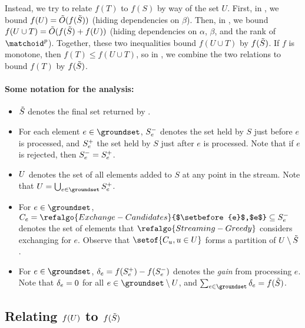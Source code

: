 \documentclass[oneside,letterpaper]{scrartcl} \usepackage{macros}
\newcommand{\mindex}{\ell}
\newcommand{\pmatchoid}{\matchoid^p} \newcommand{\defpmatchoid}{\pmatchoid = (\groundset,\independents)} \newcommand{\matroidI}{\matroid_{\mindex}} \newcommand{\groundsetI}{\groundset_{\mindex}} \newcommand{\independentsI}{\independents_{\mindex}} \newcommand{\defmatroidI}{\matroidI = (\groundsetI,\independentsI)} \newcommand{\offlineratio}{\gamma_p} \newcommand{\optset}{T^*}
\begin{document}
Instead, we try to relate $f(T)$ to $f(S)$ by way of the set
$U$. First, in , we bound $f(U) =
\tilde{O}(f(\tilde{S}))$ (hiding dependencies on $\beta$). Then, in
, we bound $f(U \cup T) =
\tilde{O}(f (\tilde{S}) + f (U))$ (hiding dependencies on $\alpha$,
$\beta$, and the rank of $\pmatchoid$). Together, these two
inequalities bound $f(U \cup T)$ by $f(\tilde{S})$. If $f$ is
monotone, then $f(T) \leq f(U \cup T)$, so in
, we combine the two
relations to bound $f(T)$ by $f(\tilde{S})$.  \fi

\paragraph{Some notation for the analysis:}
\begin{itemize}
\item $\tilde{S}$ denotes the final set returned by
  .
\item For each element $e \in \groundset$, $S_{e}^-$ denotes the
  set held by $S$ just before $e$ is processed, and $S_{e}^+$ the
  set held by $S$ just after $e$ is processed. Note that if $e$ is
  rejected, then $S_{e}^- = S_{e}^+$.
\item $U$ denotes the set of all elements added to $S$ at any
  point in the stream. Note that $\takens = \bigcup_{e \in \groundset}
  \setafter{e}$.
\item For $e \in \groundset$, $\candidatesfor{e} =
  \refalgo{Exchange-Candidates}{$\setbefore{e}$,$e$} \subseteq
  \setbefore{e}$ denotes the set of elements that
  $\refalgo{Streaming-Greedy}$ considers exchanging for $e$. Observe
  that $\setof{\candidatesfor{\taken},\taken \in \takens}$ forms a
  partition of $U \setminus \tilde{S}$.
\item For $e \in \groundset$, $\delta_{e} = f(S_{e}^+) -
  f(S_{e}^-)$ denotes the {\em gain} from processing $e$. Note
  that $\delta_{e} = 0$ for all $e \in \groundset \setminus \takens$,
  and $\sum_{e \in \groundset} \gainof{e} = f(\finalset)$.
\end{itemize}

\subsection{Relating $f(U)$ to $f(\tilde{S})$}
\newcommand{\exitvalueof}{\chi\parof}
\end{document}
